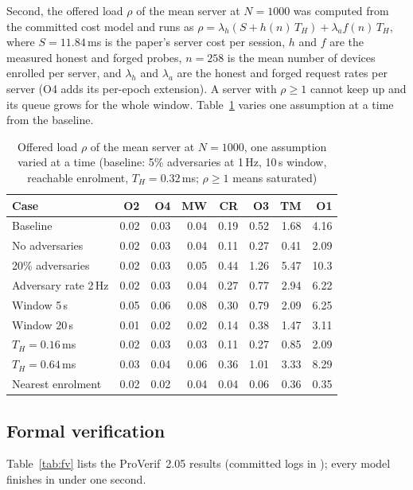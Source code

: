 Second, the offered load $\rho$ of the mean server at $N=1000$ was computed from the committed cost model and runs as $\rho=\lambda_h(S+h(n)\,T_H)+\lambda_a f(n)\,T_H$, where $S=11.84$\,ms is the paper's server cost per session, $h$ and $f$ are the measured honest and forged probes, $n=258$ is the mean number of devices enrolled per server, and $\lambda_h$ and $\lambda_a$ are the honest and forged request rates per server (O4 adds its per-epoch extension). A server with $\rho\ge1$ cannot keep up and its queue grows for the whole window. Table~\ref{tab:sens} varies one assumption at a time from the baseline.

\begin{table}[H]
\centering
\caption{Offered load $\rho$ of the mean server at $N=1000$, one assumption varied at a time (baseline: 5\% adversaries at 1\,Hz, 10\,s window, reachable enrolment, $T_H=0.32$\,ms; $\rho\ge1$ means saturated)}
\label{tab:sens}
\small
\begin{tabular}{|l|r|r|r|r|r|r|r|}
\hline
\textbf{Case} & \textbf{O2} & \textbf{O4} & \textbf{MW} & \textbf{CR} & \textbf{O3} & \textbf{TM} & \textbf{O1}\\ \hline
Baseline & 0.02 & 0.03 & 0.04 & 0.19 & 0.52 & 1.68 & 4.16\\ \hline
No adversaries & 0.02 & 0.03 & 0.04 & 0.11 & 0.27 & 0.41 & 2.09\\ \hline
20\% adversaries & 0.02 & 0.03 & 0.05 & 0.44 & 1.26 & 5.47 & 10.3\\ \hline
Adversary rate 2\,Hz & 0.02 & 0.03 & 0.04 & 0.27 & 0.77 & 2.94 & 6.22\\ \hline
Window 5\,s & 0.05 & 0.06 & 0.08 & 0.30 & 0.79 & 2.09 & 6.25\\ \hline
Window 20\,s & 0.01 & 0.02 & 0.02 & 0.14 & 0.38 & 1.47 & 3.11\\ \hline
$T_H=0.16$\,ms & 0.02 & 0.03 & 0.03 & 0.11 & 0.27 & 0.85 & 2.09\\ \hline
$T_H=0.64$\,ms & 0.03 & 0.04 & 0.06 & 0.36 & 1.01 & 3.33 & 8.29\\ \hline
Nearest enrolment & 0.02 & 0.02 & 0.04 & 0.04 & 0.06 & 0.36 & 0.35\\ \hline
\end{tabular}
\end{table}

\subsection*{Formal verification}
Table~\ref{tab:fv} lists the ProVerif~2.05 results (committed logs in ); every model finishes in under one second.

